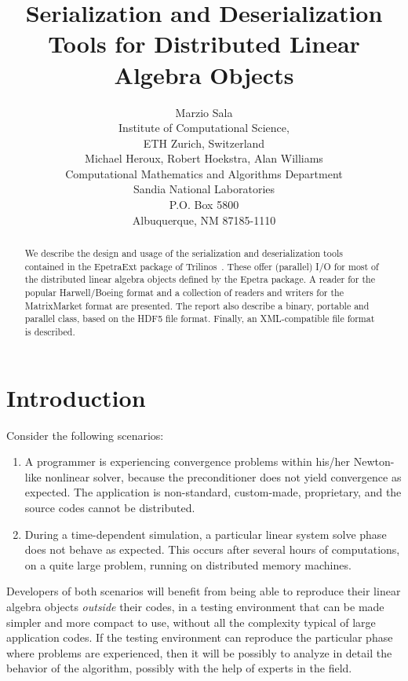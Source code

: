 \documentclass[11pt,relax]{SANDreport}
\author{Marzio Sala \\
Institute of Computational Science, \\
ETH Zurich, Switzerland \\[1cm]
Michael Heroux,   Robert Hoekstra, Alan Williams\\
Computational Mathematics and Algorithms Department \\
Sandia National Laboratories \\
P.O. Box 5800 \\
Albuquerque, NM 87185-1110 \\
}
\title{Serialization and Deserialization Tools for Distributed Linear Algebra Objects}
\begin{document}
\maketitle

\begin{abstract}
We describe the design and usage of the serialization and deserialization
tools contained in the EpetraExt package of
Trilinos~\cite{trilinos-home-page}. These offer (parallel) I/O for most
of the distributed linear algebra objects defined by the Epetra package. A
reader for the popular Harwell/Boeing format and a collection of readers and
writers for the MatrixMarket format are presented. The report also describe a
binary, portable and parallel class, based on the HDF5 file format. Finally,
  an XML-compatible file format is described. 
\end{abstract}

\SANDmain

\tableofcontents

\newpage

\section{Introduction}
\label{sec:introduction}

Consider the following scenarios:
\begin{enumerate}
\item A programmer is experiencing convergence
problems within his/her Newton-like nonlinear solver, because the
preconditioner does not yield convergence as expected. The application is
non-standard, custom-made, proprietary, and the source codes cannot be
distributed.
\item During a time-dependent
simulation, a particular linear system solve phase does not behave as expected.
This occurs after several
hours of computations, on a quite large problem, running on distributed memory
machines.
\end{enumerate}
Developers of both scenarios will benefit from being able to reproduce their
linear algebra objects {\sl outside} their codes, in a testing environment that
can be made simpler and more compact to use, without all the complexity
typical of large application codes. If the testing environment  can
reproduce the particular phase where problems are experienced, then it will be
possibly to analyze in detail the behavior of the algorithm, possibly with the
help of experts in the field.
\end{document}
